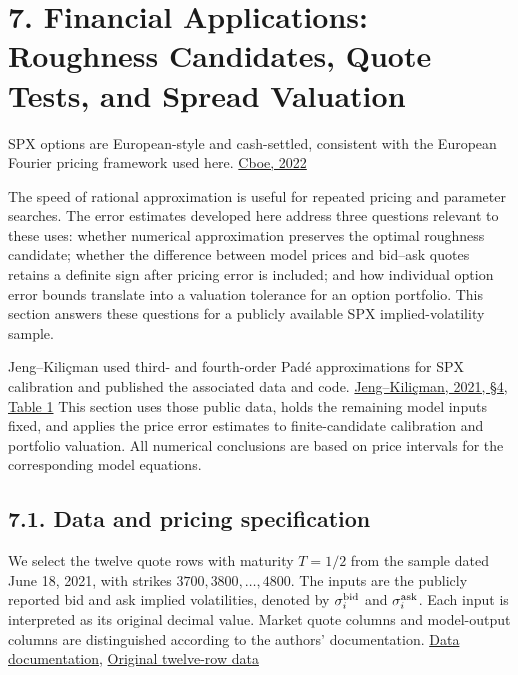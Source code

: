 \documentclass[a4paper,11pt]{article}
\begin{document}
\section*{7. Financial Applications: Roughness Candidates, Quote Tests, and Spread Valuation}

SPX options are European-style and cash-settled, consistent with the European Fourier pricing framework used here. \href{https://ir.cboe.com/news/news-details/2022/Cboe-to-Further-Expand-SP-500-Index-Options-Suite-with-New-and-Additional-Daily-Expirations-09-19-2022/default.aspx}{Cboe, 2022}

The speed of rational approximation is useful for repeated pricing and parameter searches. The error estimates developed here address three questions relevant to these uses: whether numerical approximation preserves the optimal roughness candidate; whether the difference between model prices and bid–ask quotes retains a definite sign after pricing error is included; and how individual option error bounds translate into a valuation tolerance for an option portfolio. This section answers these questions for a publicly available SPX implied-volatility sample.

Jeng–Kiliçman used third- and fourth-order Padé approximations for SPX calibration and published the associated data and code. \href{https://www.mdpi.com/2227-7390/9/21/2675}{Jeng–Kiliçman, 2021, §4, Table 1} This section uses those public data, holds the remaining model inputs fixed, and applies the price error estimates to finite-candidate calibration and portfolio valuation. All numerical conclusions are based on price intervals for the corresponding model equations.

\subsection*{7.1. Data and pricing specification}

We select the twelve quote rows with maturity $T=1/2$ from the sample dated June 18, 2021, with strikes $3700,3800,\ldots,4800$. The inputs are the publicly reported bid and ask implied volatilities, denoted by $\sigma_i^{\rm bid}$ and $\sigma_i^{\rm ask}$. Each input is interpreted as its original decimal value. Market quote columns and model-output columns are distinguished according to the authors' documentation. \href{https://github.com/WoonJeng/Dataset-for-SPX-Calibration-of-Option-Approximations-under-Rough-Heston-model/blob/860049da2b7486fe8aa509061eff23cc28c2ef89/README.md}{Data documentation}, \href{https://github.com/WoonJeng/Dataset-for-SPX-Calibration-of-Option-Approximations-under-Rough-Heston-model/blob/860049da2b7486fe8aa509061eff23cc28c2ef89/spx_decomp.csv}{Original twelve-row data}
\end{document}
